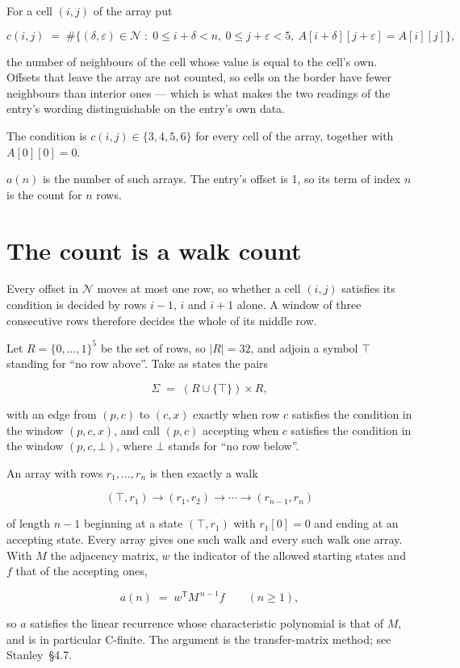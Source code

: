 \documentclass[11pt]{article}
\theoremstyle{definition}
\begin{document}
For a cell $(i,j)$ of the array put

\[c(i,j) \;=\; \#\bigl\{(\delta,\varepsilon)\in\mathcal{N} \;:\; 0\le i+\delta<n,\ 0\le j+\varepsilon<5,\ A[i+\delta][j+\varepsilon] = A[i][j]\bigr\},\]

the number of neighbours of the cell whose value is equal to the cell's own. Offsets that leave the array are not counted, so cells on the border have fewer neighbours than interior ones --- which is what makes the two readings of the entry's wording distinguishable on the entry's own data.

The condition is $c(i,j) \in \{3, 4, 5, 6\}$ for every cell of the array, together with $A[0][0]=0$.

$a(n)$ is the number of such arrays. The entry's offset is 1, so its term of index $n$ is the count for $n$ rows.

\section{The count is a walk count}

Every offset in $\mathcal{N}$ moves at most one row, so whether a cell $(i,j)$ satisfies its condition is decided by rows $i-1$, $i$ and $i+1$ alone. A window of three consecutive rows therefore decides the whole of its middle row.

Let $R = \{0,\dots,1\}^{5}$ be the set of rows, so $|R| = 32$, and adjoin a symbol $\top$ standing for ``no row above''. Take as states the pairs

\[\Sigma \;=\; (R \cup \{\top\}) \times R,\]

with an edge from $(p,c)$ to $(c,x)$ exactly when row $c$ satisfies the condition in the window $(p,c,x)$, and call $(p,c)$ accepting when $c$ satisfies the condition in the window $(p,c,\bot)$, where $\bot$ stands for ``no row below''.

An array with rows $r_1,\dots,r_n$ is then exactly a walk

\[(\top,r_1) \to (r_1,r_2) \to \cdots \to (r_{n-1},r_n)\]

of length $n-1$ beginning at a state $(\top,r_1)$ with $r_1[0]=0$ and ending at an accepting state. Every array gives one such walk and every such walk one array. With $M$ the adjacency matrix, $w$ the indicator of the allowed starting states and $f$ that of the accepting ones,

\[a(n) \;=\; w^{\mathsf T} M^{\,n-1} f \qquad (n \ge 1),\]

so $a$ satisfies the linear recurrence whose characteristic polynomial is that of $M$, and is in particular C-finite. The argument is the transfer-matrix method; see Stanley~\S4.7.
\end{document}
